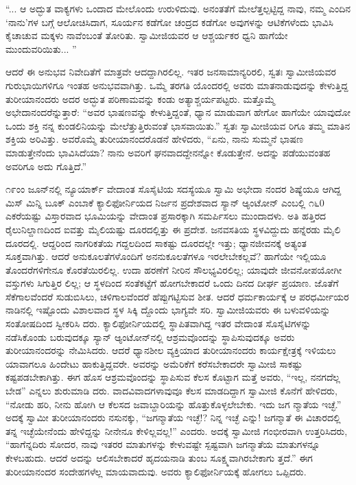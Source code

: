 “... ಆ ಅದ್ಭುತ ವಾಕ್ಯಗಳು ಒಂದಾದ ಮೇಲೊಂದು ಉರುಳಿದುವು. ಅನಂತತೆಗೆ ಮೇಲೆತ್ತಲ್ಪಟ್ಟಿದ್ದ ನಾವು, ನಮ್ಮ ಎಂದಿನ ‘ನಾನು’ಗಳ ಬಗ್ಗೆ ಆಲೋಚಿಸಿದಾಗ, ಸೂರ್ಯನ ಕಡೆಗೋ ಚಂದ್ರದ ಕಡೆಗೋ ಅವುಗಳನ್ನು ಆಟಿಕೆಗಳೆಂದು ಭಾವಿಸಿ ಕೈಚಾಚುವ ಮಕ್ಕಳು ನಾವೆಂಬಂತೆ ತೋರಿತು. ಸ್ವಾಮೀಜಿಯವರ ಆ ಆಶ್ಚರ್ಯಕರ ಧ್ವನಿ ಹಾಗೆಯೇ ಮುಂದುವರಿಯಿತು... ”

ಆದರೆ ಈ ಅನುಭವ ನಿವೇದಿತೆಗೆ ಮಾತ್ರವೇ ಆದದ್ದಾಗಿರಲಿಲ್ಲ. ಇತರ ಜನಸಾಮಾನ್ಯರಿರಲಿ, ಸ್ವತಃ ಸ್ವಾಮೀಜಿಯವರ ಗುರುಭಾಯಿಗಳಿಗೂ ಇಂತಹ ಅನುಭವವಾಗಿತ್ತು. ಒಮ್ಮೆ ತರಗತಿ ಯೊಂದರಲ್ಲಿ ಅವರು ಮಾತನಾಡುವುದನ್ನು ಕೇಳುತ್ತಿದ್ದ ತುರೀಯಾನಂದರು ಅದರ ಅದ್ಭುತ ಪರಿಣಾಮವನ್ನು ಕಂಡು ಅತ್ಯಾಶ್ಚರ್ಯಪಟ್ಟರು. ಮತ್ತೊಮ್ಮೆ ಅಭೇದಾನಂದರೆನ್ನುತ್ತಾರೆ: “ಅವರ ಭಾಷಣವನ್ನು ಕೇಳುತ್ತಿದ್ದಂತೆ, ಧ್ಯಾನ ಮಾಡುವಾಗ ಹೇಗೋ ಹಾಗೆಯೇ ಯಾವುದೋ ಒಂದು ಶಕ್ತಿ ನನ್ನ ಕುಂಡಲಿನಿಯನ್ನು ಮೇಲೆತ್ತುತ್ತಿರುವಂತೆ ಭಾಸವಾಯಿತು.” ಸ್ವತಃ ಸ್ವಾಮೀಜಿಯವ ರಿಗೂ ತಮ್ಮ ಮಾತಿನ ಶಕ್ತಿಯ ಅರಿವಿತ್ತು. ಅವರೊಮ್ಮೆ ತುರೀಯಾನಂದರೊಡನೆ ಹೇಳಿದರು, “ಏನು, ನಾನು ಸುಮ್ಮನೆ ಭಾಷಣ ಮಾಡುತ್ತೇನೆಂದು ಭಾವಿಸಿದೆಯಾ? ನಾನು ಅವರಿಗೆ ಘನವಾದದ್ದೇನನ್ನೋ ಕೊಡುತ್ತೇನೆ. ಅದನ್ನು ಪಡೆಯುವಂತಹ ಅವರಿಗೂ ಅದು ಗೊತ್ತಿದೆ.”

೧೯ಂಂ ಜೂನ್​ನಲ್ಲಿ ನ್ಯೂಯಾರ್ಕ್ ವೇದಾಂತ ಸೊಸೈಟಿಯ ಸದಸ್ಯೆಯೂ ಸ್ವಾಮಿ ಅಭೇದಾ ನಂದರ ಶಿಷ್ಯೆಯೂ ಆಗಿದ್ದ ಮಿಸ್ ಮಿನ್ನಿ ಬೂಕ್ ಎಂಬಾಕೆ ಕ್ಯಾಲಿಫೋರ್ನಿಯದ ನಿರ್ಜನ ಪ್ರದೇಶವಾದ ಸ್ಯಾನ್ ಆ್ಯಂಟೋನ್ ಎಂಬಲ್ಲಿ ೧೬0 ಎಕರೆಯಷ್ಟು ವಿಸ್ತಾರವಾದ ಭೂಮಿಯನ್ನು ವೇದಾಂತ ಪ್ರಸಾರಕ್ಕಾಗಿ ಸಮರ್ಪಿಸಲು ಮುಂದಾದಳು. ಅತಿ ಹತ್ತಿರದ ರೈಲುನಿಲ್ದಾಣದಿಂದ ಐವತ್ತು ಮೈಲಿಯಷ್ಟು ದೂರದಲ್ಲಿತ್ತು ಈ ಪ್ರದೇಶ. ಜನವಸತಿಯ ಸ್ಥಳವಿದ್ದುದು ಹನ್ನೆರಡು ಮೈಲಿ ದೂರದಲ್ಲಿ. ಆದ್ದರಿಂದ ನಾಗರಿಕತೆಯ ಗದ್ದಲದಿಂದ ಸಾಕಷ್ಟು ದೂರದಲ್ಲೇ ಇತ್ತು; ಧ್ಯಾನಜೀವನಕ್ಕೆ ಅತ್ಯಂತ ಸೂಕ್ತವಾಗಿತ್ತು. ಆದರೆ ಅನುಕೂಲತೆಗಳೊಂದಿಗೆ ಅನನುಕೂಲತೆಗಳೂ ಇರಲೇಬೇಕಲ್ಲವೆ? ಹಾಗೆಯೇ ಇಲ್ಲಿಯೂ ತೊಂದರೆಗಳಿಗೇನೂ ಕೊರತೆಯಿರಲಿಲ್ಲ. ಉದಾ ಹರಣೆಗೆ ನೀರಿನ ಸೌಲಭ್ಯವಿರಲಿಲ್ಲ; ಯಾವುದೇ ಜೀವನೋಪಯೋಗೀ ವಸ್ತುಗಳು ಸಿಗುತ್ತಿರ ಲಿಲ್ಲ; ಆ ಸ್ಥಳದಿಂದ ಸಂತೆಕಟ್ಟೆಗೆ ಹೋಗಬೇಕಾದರೆ ಒಂದು ದಿನದ ದೀರ್ಘ ಪ್ರಯಾಣ. ಜೊತೆಗೆ ಸೆಕೆಗಾಲವೆಂದರೆ ಸುಡುಬಿಸಿಲು, ಚಳಿಗಾಲವೆಂದರೆ ಹೆಪ್ಪುಗಟ್ಟಿಸುವ ಶೀತ. ಆದರೆ ಧರ್ಮಕಾರ್ಯಕ್ಕೆ ಆ ಪರಧರ್ಮೀಯರ ನಾಡಿನಲ್ಲಿ ಇಷ್ಟೊಂದು ವಿಶಾಲವಾದ ಸ್ಥಳ ಸಿಕ್ಕಿ ದ್ದೊಂದು ಭಾಗ್ಯವೇ ಸರಿ. ಸ್ವಾಮೀಜಿಯವರು ಈ ಬಳುವಳಿಯನ್ನು ಸಂತೋಷದಿಂದ ಸ್ವೀಕರಿಸಿ ದರು. ಕ್ಯಾಲಿಫೋರ್ನಿಯದಲ್ಲಿ ಸ್ಥಾಪಿತವಾಗಿದ್ದ ಇತರ ವೇದಾಂತ ಸೊಸೈಟಿಗಳನ್ನು ನಡೆಸಿಕೊಂಡು ಬರುವುದಕ್ಕೂ ಸ್ಯಾನ್ ಆ್ಯಂಟೋನ್​ನಲ್ಲಿ ಆಶ್ರಮವೊಂದನ್ನು ಸ್ಥಾಪಿಸುವುದಕ್ಕೂ ಅವರು ತುರೀಯಾನಂದರನ್ನು ನೇಮಿಸಿದರು. ಆದರೆ ಧ್ಯಾನಶೀಲ ವ್ಯಕ್ತಿಯಾದ ತುರೀಯಾನಂದರು ಕಾರ್ಯಕ್ಷೇತ್ರಕ್ಕೆ ಇಳಿಯಲು ಯಾವಾಗಲೂ ಹಿಂದೇಟು ಹಾಕುತ್ತಿದ್ದವರೇ. ಅವರನ್ನು ಅಮೆರಿಕೆಗೆ ಕರೆಸಬೇಕಾದರೇ ಸ್ವಾಮೀಜಿ ಸಾಕಷ್ಟು ಕಷ್ಟಪಡಬೇಕಾಗಿತ್ತು. ಈಗ ಹೊಸ ಆಶ್ರಮವೊಂದನ್ನು ಸ್ಥಾಪಿಸುವ ಕೆಲಸ ಕೊಟ್ಟಾಗ ಮತ್ತೆ ಅವರು, “ಇಲ್ಲ, ನನಗದೆಲ್ಲ ಬೇಡ” ಎನ್ನಲು ಶುರುಮಾಡಿ ದರು. ವಾದವಿವಾದಗಳಾವುವೂ ಕೆಲಸ ಮಾಡದಿದ್ದಾಗ ಸ್ವಾಮೀಜಿ ಕೊನೆಗೆ ಹೇಳಿದರು, “ನೋಡು ಹರಿ, ನೀನು ಹೋಗಿ ಆ ಕೆಲಸದ ಜವಾಬ್ದಾರಿಯನ್ನು ಹೊತ್ತುಕೊಳ್ಳಲೇಬೇಕು. ಇದು ಜಗ ನ್ಮಾತೆಯ ಇಚ್ಛೆ.” ಅದಕ್ಕೆ ಸ್ವಾಮೀ ತುರೀಯಾನಂದರು ನಸುನಕ್ಕು, “ಜಗನ್ಮಾತೆಯ ಇಚ್ಛೆ!? ನಿನ್ನ ಇಚ್ಛೆ ಎನ್ನು! ಜಗನ್ಮಾತೆ ಈ ವಿಚಾರದಲ್ಲಿ ತನ್ನ ಇಚ್ಛೆಯೇನೆಂದು ಹೇಳಿದ್ದನ್ನು ನೀನೇನೂ ಕೇಳಿಲ್ಲವಲ್ಲ!” ಎಂದರು. ಅದಕ್ಕೆ ಸ್ವಾಮೀಜಿ ಗಂಭೀರವಾಗಿ ಉತ್ತರಿಸಿದರು, “ಹಾಗೆನ್ನದಿರು ಸೋದರ, ನಾವು ಇತರರ ಮಾತುಗಳನ್ನು ಕೇಳುವಷ್ಟೇ ಸ್ಪಷ್ಟವಾಗಿ ಜಗನ್ಮಾತೆಯ ಮಾತುಗಳನ್ನೂ ಕೇಳಬಹುದು. ಆದರೆ ಅದನ್ನು ಆಲಿಸಬೇಕಾದರೆ ಹೃದಯನಾಡಿ ತುಂಬ ಸೂಕ್ಷ್ಮವಾಗಿರಬೇಕಾಗು ತ್ತದೆ.” ಈಗ ತುರೀಯಾನಂದರ ಸಂದೇಹಗಳೆಲ್ಲ ಮಾಯವಾದುವು. ಅವರು ಕ್ಯಾಲಿಫೋರ್ನಿಯಕ್ಕೆ ಹೋಗಲು ಒಪ್ಪಿದರು.

